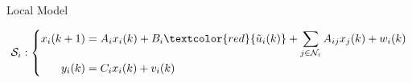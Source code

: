 \documentclass[presentation]{beamer}
\begin{document}



\begin{frame}{Local Model}

\begin{equation*}
    \mathcal S_i:\left\lbrace
    \begin{aligned}
    	x_i(k+1) &= A_ix_i(k) + B_i \textcolor{red}{\tilde u_i(k)} + \sum_{j \in \mathcal N_i}A_{ij}x_j(k) + w_i(k)\\
        y_i(k) &= C_ix_i(k) + v_i(k)
    \end{aligned}\right.
\end{equation*}


\end{frame}
\end{document}
